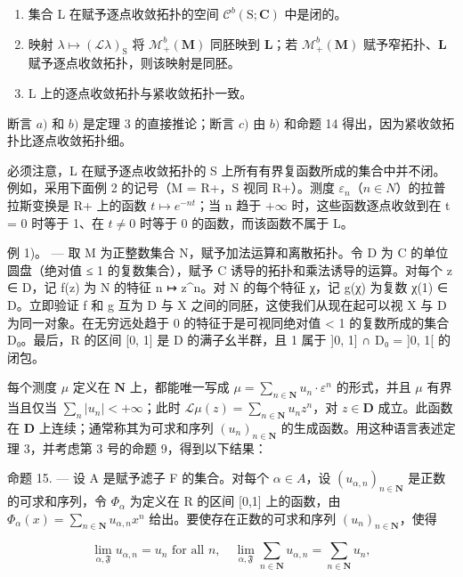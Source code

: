 \begin{enumerate}
\def\labelenumi{\alph{enumi})}
\item
  集合 L 在赋予逐点收敛拓扑的空间 \(\mathcal{C}^{b}(\mathrm{S};\mathbf{C})\) 中是闭的。
\item
映射 \(\lambda \mapsto (\mathcal{L}\lambda)_\mathrm{S}\) 将 \(\mathcal{M}_+^b (\mathbf{M})\) 同胚映到 \(\mathbf{L}\)；若 \(\mathcal{M}_+^b (\mathbf{M})\) 赋予窄拓扑、\(\mathbf{L}\) 赋予逐点收敛拓扑，则该映射是同胚。
\item
  L 上的逐点收敛拓扑与紧收敛拓扑一致。
\end{enumerate}

断言 \(a)\) 和 \(b)\) 是定理 3 的直接推论；断言 \(c)\) 由 \(b)\) 和命题 14 得出，因为紧收敛拓扑比逐点收敛拓扑细。

必须注意，L 在赋予逐点收敛拓扑的 S 上所有有界复函数所成的集合中并不闭。例如，采用下面例 2 的记号（M = R+，S 视同 R+）。测度 \(\varepsilon_{n}\)（\(n \in N\)）的拉普拉斯变换是 R+ 上的函数 \(t \mapsto e^{-nt}\)；当 n 趋于 \(+\infty\) 时，这些函数逐点收敛到在 t = 0 时等于 1、在 \(t \neq 0\) 时等于 0 的函数，而该函数不属于 L。

例 1)。 --- 取 M 为正整数集合 N，赋予加法运算和离散拓扑。令 D 为 C 的单位圆盘（绝对值 ≤ 1 的复数集合），赋予 C 诱导的拓扑和乘法诱导的运算。对每个 z ∈ D，记 f(z) 为 N 的特征 n ↦ z\^{}n。对 N 的每个特征 χ，记 g(χ) 为复数 χ(1) ∈ D。立即验证 f 和 g 互为 D 与 X 之间的同胚，这使我们从现在起可以视 X 与 D 为同一对象。在无穷远处趋于 0 的特征于是可视同绝对值 \textless{} 1 的复数所成的集合 D₀。最后，R 的区间 {[}0, 1{]} 是 D 的满子幺半群，且 1 属于 {]}0, 1{]} ∩ D₀ = {]}0, 1{[} 的闭包。

每个测度 \(\mu\) 定义在 \(\mathbf{N}\) 上，都能唯一写成 \(\mu = \sum_{n\in \mathbf{N}}u_n\cdot \varepsilon^n\) 的形式，并且 \(\mu\) 有界当且仅当 \(\sum_{n}|u_n| < +\infty\)；此时 \(\mathcal{L}\mu (z) = \sum_{n\in \mathbf{N}}u_nz^n\)，对 \(z\in \mathbf{D}\) 成立。此函数在 \(\mathbf{D}\) 上连续；通常称其为可求和序列 \((u_n)_{n\in \mathbf{N}}\) 的生成函数。用这种语言表述定理 3，并考虑第 3 号的命题 9，得到以下结果：

命题 15. --- 设 A 是赋予滤子 F 的集合。对每个 \(\alpha\in A\)，设 \((u_{\alpha,n})_{n\in\mathbf{N}}\) 是正数的可求和序列，令 \(\Phi_{\alpha}\) 为定义在 R 的区间 {[}0,1{]} 上的函数，由 \(\Phi_{\alpha}(x)=\sum_{n\in\mathbf{N}}u_{\alpha,n}x^{n}\) 给出。要使存在正数的可求和序列 \((u_{n})_{n\in\mathbf{N}}\)，使得

\[
\lim _ {\alpha , \mathfrak {F}} u _ {\alpha , n} = u _ {n} \text {   for   all   } n, \quad \lim _ {\alpha , \mathfrak {F}} \sum_ {n \in \mathbf {N}} u _ {\alpha , n} = \sum_ {n \in \mathbf {N}} u _ {n},
\]

